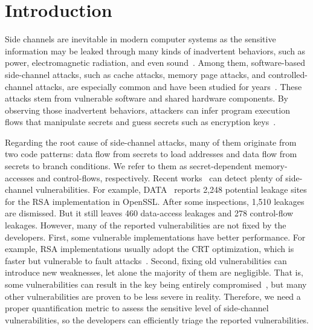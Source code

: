 \section{Introduction} 
Side channels are inevitable in modern computer systems as the sensitive
information may be leaked through many kinds of inadvertent behaviors, such as power,
electromagnetic radiation, and even
sound~\cite{agrawal2002side,kar20178,chari1999towards,217605,genkin2014rsa}.
Among them, software-based side-channel attacks, such as cache attacks, memory page
attacks, and controlled-channel attacks, are especially common and have been
studied for years~\cite{7163052,217543,217589,lee2017inferring,191010,liu2015last}. These
attacks stem from vulnerable software and shared hardware components.
By observing those inadvertent behaviors, attackers can infer program
execution flows that manipulate secrets and guess secrets such as encryption
keys~\cite{Osvik2006,Gullasch:2011:CGB:2006077.2006784,203878,10.1007/978-3-540-45238-6_6}.


Regarding the root cause of side-channel attacks, many of them originate
from two code patterns: data flow from secrets to load
addresses and data flow from secrets to branch conditions. We refer to them as
secret-dependent memory-accesses and control-flows, respectively. 
Recent works~\cite{203878,217537,Wichelmann:2018:MFF:3274694.3274741,Brotzman19Casym,236338,182946}
can detect plenty of side-channel vulnerabilities. For example,
DATA~\cite{217537} reports 2,248 potential leakage sites for the RSA
implementation in OpenSSL\@. 
After some inspections, 1,510 leakages are dismissed. But it
still leaves 460 data-access leakages and 278 control-flow leakages. 
However, many of the reported vulnerabilities are not fixed by the developers.
First, some vulnerable implementations have better performance. For example,
RSA implementations usually adopt the CRT optimization,
which is faster but vulnerable to fault attacks~\cite{aumuller2002fault}.
Second, fixing old vulnerabilities can introduce new 
weaknesses, let alone the majority of them are negligible. 
That is, some vulnerabilities can result in the key being 
entirely compromised~\cite{184415, aumuller2002fault}, 
but many other vulnerabilities are proven to be less
severe in reality. Therefore, we need a proper quantification metric to 
assess the sensitive level of side-channel vulnerabilities,
so the developers can efficiently triage the reported vulnerabilities.

